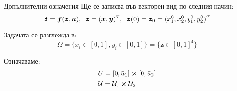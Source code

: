 \begin{frame}{Допълнителни означения}
  Ще се записва във векторен вид по следния начин:
  \begin{equation*}
    \dot{\boldsymbol{z}} = \boldsymbol{f}(\boldsymbol{z}, \boldsymbol{u}), \hspace{0.5em} \boldsymbol{z} = (\boldsymbol{x}, \boldsymbol{y})^T, \hspace{0.5em} \boldsymbol{z}(0) = \boldsymbol{z}_0 = (x_1^0, x_2^0, y_1^0, y_2^0)^T
  \end{equation*}

Задачата се разглежда в:
  \begin{equation*}
    \Omega = \{x_i \in [0, 1], y_i \in [0, 1]\} = \{\boldsymbol{z} \in [0, 1]^4\}
    \end{equation*}

  Означаваме:
  \begin{equation*}
    \begin{split}
      &U = [0, \bar{u}_1] \cross [0, \bar{u}_2] \\
      &\mathcal{U} = \mathcal{U}_1 \cross \mathcal{U}_2
    \end{split}
  \end{equation*}

\end{frame}

